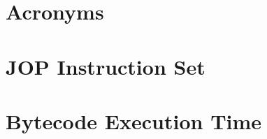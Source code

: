 \chapter{Acronyms}
 \label{appx:acro}



\chapter{JOP Instruction Set} \label{appx:jop:instr}


\chapter{Bytecode Execution Time} \label{appx:bytecode}


%

%



